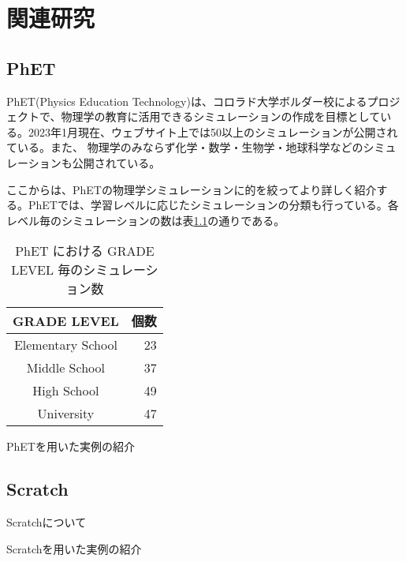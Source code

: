 \chapter{関連研究} \label{related}

\section{PhET}

PhET(Physics Education Technology)\cite{Perkins2006PhETIS}は、コロラド大学ボルダー校によるプロジェクトで、物理学の教育に活用できるシミュレーションの作成を目標としている。2023年1月現在、ウェブサイト\cite{PhET}上では50以上のシミュレーションが公開されている。また、
物理学のみならず化学・数学・生物学・地球科学などのシミュレーションも公開されている。

ここからは、PhETの物理学シミュレーションに的を絞ってより詳しく紹介する。PhETでは、学習レベルに応じたシミュレーションの分類も行っている。各レベル毎のシミュレーションの数は表\ref{PhET_sim_count_table}の通りである。

\begin{table}[htb]
\label{PhET_sim_count_table}
\centering
\caption{PhET における GRADE LEVEL 毎のシミュレーション数}
\begin{tabular}{cr}
  GRADE LEVEL & 個数 \\
  \hline
  Elementary School & 23 \\
  Middle School & 37 \\
  High School & 49 \\
  University & 47 \\
\end{tabular}
\end{table}


PhETを用いた実例の紹介
\cite{prima_learning_2018}
\cite{rehman_teaching_2021}

\section{Scratch}

Scratch\cite{Scratch}について

Scratchを用いた実例の紹介
\cite{Lpez2015ScratchAA}

